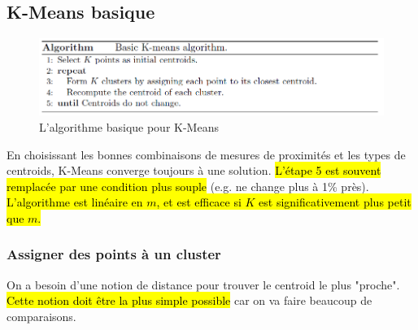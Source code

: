\documentclass[letterpaper, 12pt]{article}
\newcommand{\alinea}{
\hspace*{0.5cm}}
\begin{document}
		\subsection{K-Means basique}
			\begin{figure}[H]
				\centering
				\includegraphics[scale=0.7]{Images/k-means_algo.png}
				\caption{L'algorithme basique pour K-Means}
				\label{fig:kmeans:algo:basic}
			\end{figure}\noindent
			\alinea En choisissant les bonnes combinaisons de mesures 
				de proximités et les types de centroids, K-Means 
				converge toujours à une solution.
				\hl{L'étape 5 est souvent remplacée par une condition
				plus souple} (e.g. ne change plus à 1\% près).
				\hl{L'algorithme est linéaire en $m$, et est efficace si 
				$K$ est significativement plus petit que $m$.}
			\subsubsection{Assigner des points à un cluster}
				\alinea On a besoin d'une notion de distance
					pour trouver le centroid le plus "proche".
					\hl{Cette notion doit être la plus simple possible} 
					car on va faire beaucoup de comparaisons.
\end{document}
